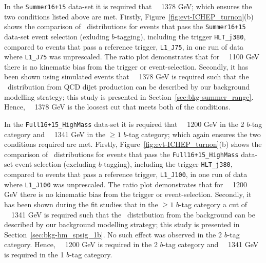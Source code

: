 In the \verb|Summer16+15| data-set it is required that \mjj~\gt~1378 GeV;
which ensures the two conditions listed above are met.
Firstly, Figure~\ref{fig:evt-ICHEP_turnon}(b) shows the comparison of \mjj~distributions for events
that pass the \verb|Summer16+15| data-set event selection (exluding $b$-tagging), including the trigger \verb|HLT_j380|,
compared to events that pass a reference trigger, \verb|L1_J75|,
in one run of data where \verb|L1_J75| was unprescaled.
The ratio plot demonstrates that for \mjj~\gt~1100 GeV there is no kinematic bias from the trigger or event-selection.
Secondly, it has been shown using simulated events that
\mjj~\gt~1378 GeV is required such that the \mjj~distribution from QCD dijet production
can be described by our background modelling strategy;
this study is presented in Section~\ref{sec:bkg-summer_range}.
Hence, \mjj~\gt~1378 GeV is the loosest cut that meets both of the conditions.

In the \verb|Full16+15_HighMass| data-set it is required that \mjj~\gt~1200 GeV in the 2 $b$-tag category and
\mjj~\gt~1341 GeV in the $\geq1$ $b$-tag category;
which again ensures the two conditions required are met.
Firstly, Figure~\ref{fig:evt-ICHEP_turnon}(b) shows the comparison of \mjj~distributions for events
that pass the \verb|Full16+15_HighMass| data-set event selection (excluding $b$-tagging), including the trigger \verb|HLT_j380|,
compared to events that pass a reference trigger, \verb|L1_J100|,
in one run of data where \verb|L1_J100| was unprescaled.
The ratio plot demonstrates that for \mjj~\gt~1200 GeV there is no kinematic bias from the trigger or event-selection.
Secondly, it has been shown during the fit studies that
in the $\geq1$ $b$-tag category a cut of \mjj~\gt~1341 GeV is required such that the
\mjj~distribution from the background can be described by our background modelling strategy;
this study is presented in Section~\ref{sec:bkg-hm_spsig_1b}.
No such effect was observed in the 2 $b$-tag category.
Hence, \mjj~\gt~1200 GeV is required in the 2 $b$-tag category and
\mjj~\gt~1341 GeV is required in the 1 $b$-tag category.

